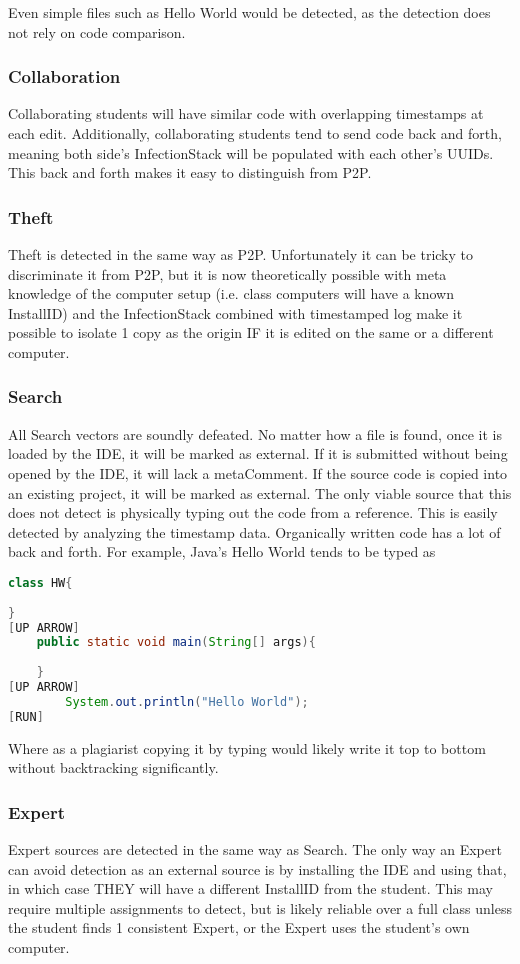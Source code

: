 \documentclass[conference]{IEEEtran}
\newcommand{\installID}{InstallID\xspace}
\newcommand{\metaComment}{metaComment\xspace}
\newcommand{\infectionStack}{InfectionStack\xspace}
\begin{document}
		Even simple files such as Hello World would be detected, as the detection does not rely on code comparison.
	\subsubsection*{\textbf{Collaboration}}\hfill\break\indent
		Collaborating students will have similar code with overlapping timestamps at each edit.  Additionally, collaborating students tend to send code back and forth, meaning both side's \infectionStack will be populated with each other's UUIDs.  This back and forth makes it easy to distinguish from P2P.
	\subsubsection*{\textbf{Theft}}\hfill\break\indent
	Theft is detected in the same way as P2P.  Unfortunately it can be tricky to discriminate it from P2P, but it is now theoretically possible with meta knowledge of the computer setup (i.e. class computers will have a known \installID) and the \infectionStack combined with timestamped log make it possible to isolate 1 copy as the origin IF it is edited on the same or a different computer.  
	\subsubsection*{\textbf{Search}}\hfill\break\indent
		All Search vectors are soundly defeated.  No matter how a file is found, once it is loaded by the IDE, it will be marked as external. If it is submitted without being opened by the IDE, it will lack a \metaComment.  If the source code is copied into an existing project, it will be marked as external.  The only viable source that this does not detect is physically typing out the code from a reference.  This is easily detected by analyzing the timestamp data.  Organically written code has a lot of back and forth.  For example, Java's Hello World tends to be typed as 

\begin{lstlisting}[language=Java]
class HW{
		
}
[UP ARROW]
	public static void main(String[] args){
	
	}
[UP ARROW]
		System.out.println("Hello World");
[RUN]
\end{lstlisting}
		Where as a plagiarist copying it by typing would likely write it top to bottom without backtracking significantly.
	\subsubsection*{\textbf{Expert} }\hfill\break\indent
	Expert sources are detected in the same way as Search.  The only way an Expert can avoid detection as an external source is by installing the IDE and using that, in which case THEY will have a different \installID from the student.  This may require multiple assignments to detect, but is likely reliable over a full class unless the student finds 1 consistent Expert, or the Expert uses the student's own computer.
\end{document}
